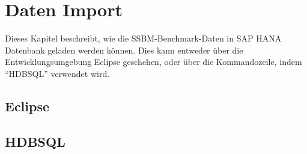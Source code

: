 \chapter{Daten Import}
Dieses Kapitel beschreibt, wie die SSBM-Benchmark-Daten in SAP HANA Datenbank geladen werden können. Dies kann entweder über die Entwicklungsumgebung Eclipse geschehen, oder über die Kommandozeile, indem \enquote{HDBSQL} verwendet wird.

\section{Eclipse}

\section{HDBSQL}


